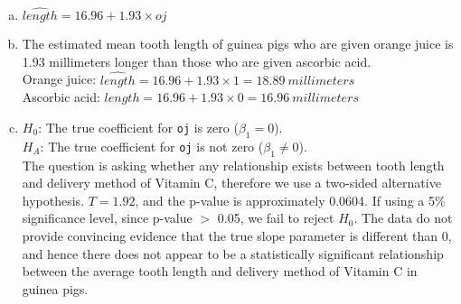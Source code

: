 {
\begin{enumerate}[(a)]
\setlength{\itemsep}{0mm}
\item $\widehat{length} = 16.96 + 1.93 \times oj$
\item The estimated mean tooth length of guinea pigs who are given orange juice is 1.93 millimeters longer than those who are given ascorbic acid. \\
Orange juice: $\widehat{length} = 16.96 + 1.93 \times 1 = 18.89~millimeters $ \\
Ascorbic acid: $\widehat{length} = 16.96 + 1.93 \times 0 = 16.96~millimeters $ 
\item $H_0$: The true coefficient for \texttt{oj} is zero ($\beta_1 = 0$). \\
$H_A$: The true coefficient for \texttt{oj} is not zero ($\beta_1 \ne 0$). \\
The question is asking whether any relationship exists
 between tooth length and delivery method of Vitamin C, therefore we use a two-sided alternative hypothesis. $T = 1.92$, and the p-value is approximately 0.0604. If using a 5\% significance level, since p-value $>$ 0.05, we fail to reject $H_0$. The data do not provide convincing evidence that the true slope parameter is different than 0, and hence there does not appear to be a statistically significant relationship between the average tooth length and delivery method of Vitamin C in guinea pigs.
\end{enumerate}
}


